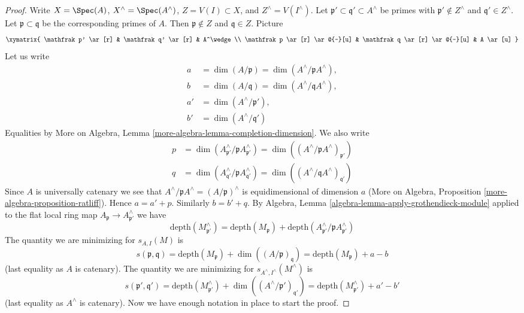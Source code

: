 \begin{proof}
Write $X = \Spec(A)$, $X^\wedge = \Spec(A^\wedge)$, $Z = V(I) \subset X$, and
$Z^\wedge = V(I^\wedge)$.
Let $\mathfrak p' \subset \mathfrak q' \subset A^\wedge$
be primes with $\mathfrak p' \not \in Z^\wedge$ and
$\mathfrak q' \in Z^\wedge$. Let $\mathfrak p \subset \mathfrak q$
be the corresponding primes of $A$. Then $\mathfrak p \not \in Z$
and $\mathfrak q \in Z$. Picture
$$
\xymatrix{
\mathfrak p' \ar[r] & \mathfrak q' \ar[r] & A^\wedge \\
\mathfrak p \ar[r] \ar@{-}[u] &
\mathfrak q \ar[r] \ar@{-}[u] & A \ar[u]
}
$$
Let us write
\begin{align*}
a & = \dim(A/\mathfrak p) = \dim(A^\wedge/\mathfrak pA^\wedge),\\
b & = \dim(A/\mathfrak q) = \dim(A^\wedge/\mathfrak qA^\wedge),\\
a' & = \dim(A^\wedge/\mathfrak p'),\\
b' & = \dim(A^\wedge/\mathfrak q')
\end{align*}
Equalities by
More on Algebra, Lemma \ref{more-algebra-lemma-completion-dimension}.
We also write
\begin{align*}
p & = \dim(A^\wedge_{\mathfrak p'}/\mathfrak p A^\wedge_{\mathfrak p'}) =
\dim((A^\wedge/\mathfrak p A^\wedge)_{\mathfrak p'}) \\
q & = \dim(A^\wedge_{\mathfrak q'}/\mathfrak p A^\wedge_{\mathfrak q'}) =
\dim((A^\wedge/\mathfrak q A^\wedge)_{\mathfrak q'})
\end{align*}
Since $A$ is universally catenary we see that
$A^\wedge/\mathfrak pA^\wedge = (A/\mathfrak p)^\wedge$
is equidimensional of dimension $a$
(More on Algebra, Proposition \ref{more-algebra-proposition-ratliff}).
Hence $a = a' + p$. Similarly $b = b' + q$.
By Algebra, Lemma \ref{algebra-lemma-apply-grothendieck-module}
applied to the flat local ring map
$A_\mathfrak p \to A^\wedge_{\mathfrak p'}$
we have
$$
\text{depth}(M^\wedge_{\mathfrak p'})
=
\text{depth}(M_\mathfrak p) +
\text{depth}(A^\wedge_{\mathfrak p'} / \mathfrak p A^\wedge_{\mathfrak p'})
$$
The quantity we are minimizing for $s_{A, I}(M)$ is
$$
s(\mathfrak p, \mathfrak q) =
\text{depth}(M_\mathfrak p) + \dim((A/\mathfrak p)_\mathfrak q) =
\text{depth}(M_\mathfrak p) + a - b
$$
(last equality as $A$ is catenary). The quantity we are minimizing
for $s_{A^\wedge, I^\wedge}(M^\wedge)$
is
$$
s(\mathfrak p', \mathfrak q') =
\text{depth}(M^\wedge_{\mathfrak p'}) +
\dim((A^\wedge/\mathfrak p')_{\mathfrak q'}) =
\text{depth}(M^\wedge_{\mathfrak p'}) + a' - b'
$$
(last equality as $A^\wedge$ is catenary).
Now we have enough notation in place to start the proof.


\end{proof}
